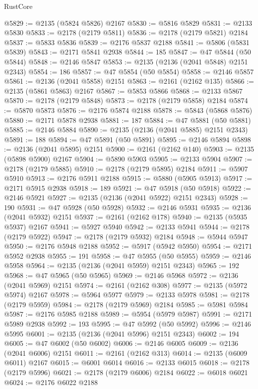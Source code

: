\begin{lexlean}{RustCore}
\begin{coremodule}
@5829 := @2135 (@5824 @5826) @2167
@5830 := @5816 @5829
@5831 := @2133 @5830
@5833 := @2178 (@2179 @5811)
@5836 := @2178 (@2179 @5821) @2184
@5837 := @5833 @5836
@5839 := @2176 @5837 @2188
@5841 := @5806 (@5831 @5839)
@5843 := @2171 @5841 @2938
@5844 := 185
@5847 := @47 @5844 (@50 @5844)
@5848 := @2146 @5847
@5853 := @2135 (@2136 (@2041 @5848) @2151 @2343)
@5854 := 186
@5857 := @47 @5854 (@50 @5854)
@5858 := @2146 @5857
@5861 := @2136 (@2041 @5858) @2151
@5863 := @2161 (@2162 @135)
@5866 := @2135 (@5861 @5863) @2167
@5867 := @5853 @5866
@5868 := @2133 @5867
@5870 := @2178 (@2179 @5848)
@5873 := @2178 (@2179 @5858) @2184
@5874 := @5870 @5873
@5876 := @2176 @5874 @2188
@5878 := @5843 (@5868 @5876)
@5880 := @2171 @5878 @2938
@5881 := 187
@5884 := @47 @5881 (@50 @5881)
@5885 := @2146 @5884
@5890 := @2135 (@2136 (@2041 @5885) @2151 @2343)
@5891 := 188
@5894 := @47 @5891 (@50 @5891)
@5895 := @2146 @5894
@5898 := @2136 (@2041 @5895) @2151
@5900 := @2161 (@2162 @140)
@5903 := @2135 (@5898 @5900) @2167
@5904 := @5890 @5903
@5905 := @2133 @5904
@5907 := @2178 (@2179 @5885)
@5910 := @2178 (@2179 @5895) @2184
@5911 := @5907 @5910
@5913 := @2176 @5911 @2188
@5915 := @5880 (@5905 @5913)
@5917 := @2171 @5915 @2938
@5918 := 189
@5921 := @47 @5918 (@50 @5918)
@5922 := @2146 @5921
@5927 := @2135 (@2136 (@2041 @5922) @2151 @2343)
@5928 := 190
@5931 := @47 @5928 (@50 @5928)
@5932 := @2146 @5931
@5935 := @2136 (@2041 @5932) @2151
@5937 := @2161 (@2162 @178)
@5940 := @2135 (@5935 @5937) @2167
@5941 := @5927 @5940
@5942 := @2133 @5941
@5944 := @2178 (@2179 @5922)
@5947 := @2178 (@2179 @5932) @2184
@5948 := @5944 @5947
@5950 := @2176 @5948 @2188
@5952 := @5917 (@5942 @5950)
@5954 := @2171 @5952 @2938
@5955 := 191
@5958 := @47 @5955 (@50 @5955)
@5959 := @2146 @5958
@5964 := @2135 (@2136 (@2041 @5959) @2151 @2343)
@5965 := 192
@5968 := @47 @5965 (@50 @5965)
@5969 := @2146 @5968
@5972 := @2136 (@2041 @5969) @2151
@5974 := @2161 (@2162 @308)
@5977 := @2135 (@5972 @5974) @2167
@5978 := @5964 @5977
@5979 := @2133 @5978
@5981 := @2178 (@2179 @5959)
@5984 := @2178 (@2179 @5969) @2184
@5985 := @5981 @5984
@5987 := @2176 @5985 @2188
@5989 := @5954 (@5979 @5987)
@5991 := @2171 @5989 @2938
@5992 := 193
@5995 := @47 @5992 (@50 @5992)
@5996 := @2146 @5995
@6001 := @2135 (@2136 (@2041 @5996) @2151 @2343)
@6002 := 194
@6005 := @47 @6002 (@50 @6002)
@6006 := @2146 @6005
@6009 := @2136 (@2041 @6006) @2151
@6011 := @2161 (@2162 @313)
@6014 := @2135 (@6009 @6011) @2167
@6015 := @6001 @6014
@6016 := @2133 @6015
@6018 := @2178 (@2179 @5996)
@6021 := @2178 (@2179 @6006) @2184
@6022 := @6018 @6021
@6024 := @2176 @6022 @2188

\end{coremodule}
\end{lexlean}
